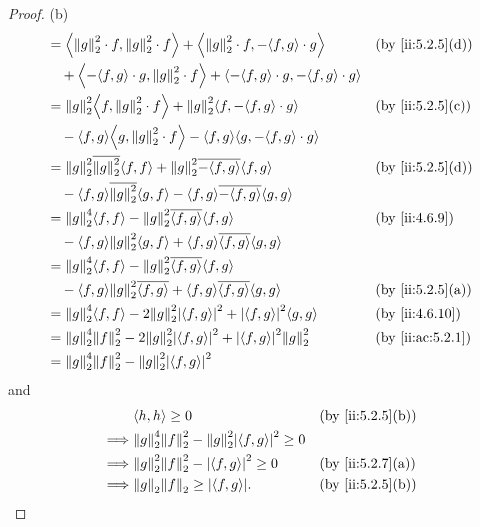 \begin{proof}{(b)}
\begin{align*}
     & = \inner*{\norm*{g}_2^2 \cdot f, \norm*{g}_2^2 \cdot f} + \inner*{\norm*{g}_2^2 \cdot f, -\inner*{f, g} \cdot g}         &  & \by{ii:5.2.5}[d] \\
     & \quad + \inner*{-\inner*{f, g} \cdot g, \norm*{g}_2^2 \cdot f} + \inner*{-\inner*{f, g} \cdot g, -\inner*{f, g} \cdot g}                       \\
     & = \norm*{g}_2^2 \inner*{f, \norm*{g}_2^2 \cdot f} + \norm*{g}_2^2 \inner*{f, -\inner*{f, g} \cdot g}                     &  & \by{ii:5.2.5}[c] \\
     & \quad - \inner*{f, g} \inner*{g, \norm*{g}_2^2 \cdot f} - \inner*{f, g} \inner*{g, -\inner*{f, g} \cdot g}                                     \\
     & = \norm*{g}_2^2 \overline{\norm*{g}_2^2} \inner*{f, f} + \norm*{g}_2^2 \overline{-\inner*{f, g}} \inner*{f, g}           &  & \by{ii:5.2.5}[d] \\
     & \quad - \inner*{f, g} \overline{\norm*{g}_2^2} \inner*{g, f} - \inner*{f, g} \overline{-\inner*{f, g}} \inner*{g, g}                           \\
     & = \norm*{g}_2^4 \inner*{f, f} - \norm*{g}_2^2 \overline{\inner*{f, g}} \inner*{f, g}                                     &  & \by{ii:4.6.9}    \\
     & \quad - \inner*{f, g} \norm*{g}_2^2 \inner*{g, f} + \inner*{f, g} \overline{\inner*{f, g}} \inner*{g, g}                                       \\
     & = \norm*{g}_2^4 \inner*{f, f} - \norm*{g}_2^2 \overline{\inner*{f, g}} \inner*{f, g}                                                           \\
     & \quad - \inner*{f, g} \norm*{g}_2^2 \overline{\inner*{f, g}} + \inner*{f, g} \overline{\inner*{f, g}} \inner*{g, g}      &  & \by{ii:5.2.5}[a] \\
     & = \norm*{g}_2^4 \inner*{f, f} - 2 \norm*{g}_2^2 \abs{\inner*{f, g}}^2 + \abs{\inner*{f, g}}^2 \inner*{g, g}              &  & \by{ii:4.6.10}   \\
     & = \norm*{g}_2^4 \norm*{f}_2^2 - 2 \norm*{g}_2^2 \abs{\inner*{f, g}}^2 + \abs{\inner*{f, g}}^2 \norm*{g}_2^2              &  & \by{ii:ac:5.2.1} \\
     & = \norm*{g}_2^4 \norm*{f}_2^2 - \norm*{g}_2^2 \abs{\inner*{f, g}}^2
  \end{align*}
  and
  \begin{align*}
             & \inner*{h, h} \geq 0                                                     &  & \by{ii:5.2.5}[b] \\
    \implies & \norm*{g}_2^4 \norm*{f}_2^2 - \norm*{g}_2^2 \abs{\inner*{f, g}}^2 \geq 0                       \\
    \implies & \norm*{g}_2^2 \norm*{f}_2^2 - \abs{\inner*{f, g}}^2 \geq 0               &  & \by{ii:5.2.7}[a] \\
    \implies & \norm*{g}_2 \norm*{f}_2 \geq \abs{\inner*{f, g}}.                        &  & \by{ii:5.2.5}[b]
  \end{align*}
\end{proof}

